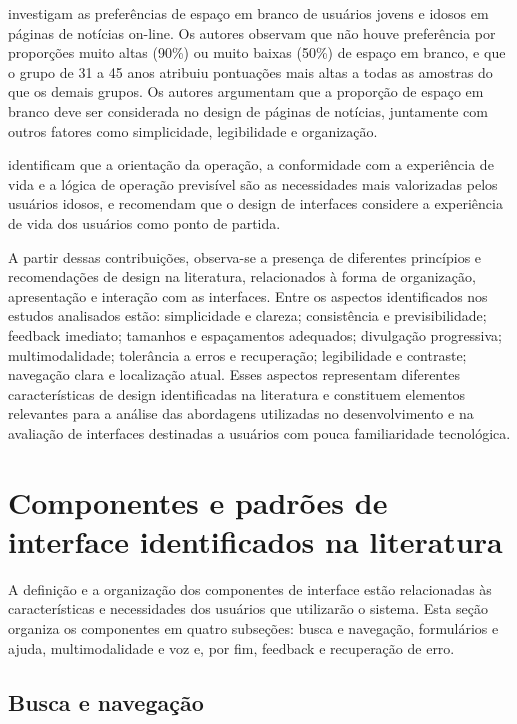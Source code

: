 \cite{ko2019old} investigam as preferências de espaço em branco de usuários jovens e idosos em páginas de notícias on-line. Os autores observam que não houve preferência por proporções muito altas (90\%) ou muito baixas (50\%) de espaço em branco, e que o grupo de 31 a 45 anos atribuiu pontuações mais altas a todas as amostras do que os demais grupos. Os autores argumentam que a proporção de espaço em branco deve ser considerada no design de páginas de notícias, juntamente com outros fatores como simplicidade, legibilidade e organização.

\cite{wang2020research} identificam que a orientação da operação, a conformidade com a experiência de vida e a lógica de operação previsível são as necessidades mais valorizadas pelos usuários idosos, e recomendam que o design de interfaces considere a experiência de vida dos usuários como ponto de partida.

A partir dessas contribuições, observa-se a presença de diferentes princípios e recomendações de design na literatura, relacionados à forma de organização, apresentação e interação com as interfaces. Entre os aspectos identificados nos estudos analisados estão: simplicidade e clareza; consistência e previsibilidade; feedback imediato; tamanhos e espaçamentos adequados; divulgação progressiva; multimodalidade; tolerância a erros e recuperação; legibilidade e contraste; navegação clara e localização atual. Esses aspectos representam diferentes características de design identificadas na literatura e constituem elementos relevantes para a análise das abordagens utilizadas no desenvolvimento e na avaliação de interfaces destinadas a usuários com pouca familiaridade tecnológica.

\section{Componentes e padrões de interface identificados na literatura}

\label{sec:componentes}

A definição e a organização dos componentes de interface estão relacionadas às características e necessidades dos usuários que utilizarão o sistema. Esta seção organiza os componentes em quatro subseções: busca e navegação, formulários e ajuda, multimodalidade e voz e, por fim, feedback e recuperação de erro.

\subsection{Busca e navegação}

